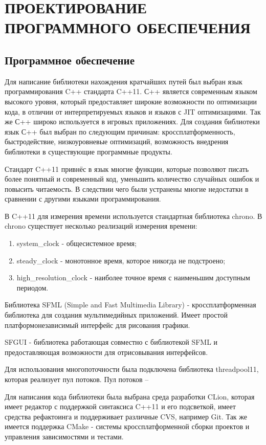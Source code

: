 \section{\MakeTextUppercase{ПРОЕКТИРОВАНИЕ ПРОГРАММНОГО ОБЕСПЕЧЕНИЯ}}
\subsection{Программное обеспечение}

Для написание библиотеки нахождения кратчайших путей был выбран язык программирования C++ стандарта C++11. С++ является современным языком высокого уровня, который предоставляет широкие возможности по оптимизации кода, в отличии от интерпретируемых языков и языков с JIT оптимизациями. Так же С++ широко используется в игровых приложениях. Для создания библиотеки язык С++ был выбран по следующим причинам: кроссплатформенность, быстродействие, низкоуровневые оптимизаций, возможность внедрения библиотеки в существующие программные продукты. 

Стандарт C++11 привнёс в язык многие функции, которые позволяют писать более понятный и современный код, уменьшить количество случайных ошибок и повысить читаемость. В следствии чего были устранены многие недостатки в сравнении с другими языками программирования.

В C++11 для измерения времени используется стандартная библиотека chrono. В chrono существует несколько реализаций измерения времени:

\begin{enumerate}
    \item system\_clock - общесистемное время;
    \item steady\_clock - монотонное время, которое никогда не подстроено;
    \item high\_resolution\_clock - наиболее точное время с наименьшим доступным периодом.  
\end{enumerate} 

Библиотека SFML (Simple and Fast Multimedia Library) - кроссплатформенная библиотека для создания мультимедийных приложений. Имеет простой платформонезависимый интерфейс для рисования графики.

SFGUI - библиотека работающая совместно с библиотекой SFML и предоставляющая возможности для отрисовывания интерфейсов.

Для использования многопоточности была подключена библиотека threadpool11, которая реализует пул потоков. Пул потоков -- 

Для написания кода библиотеки была выбрана среда разработки CLion, которая имеет редактор с поддержкой синтаксиса C++11 и его подсветкой, имеет средства рефактоинга и поддерживает различные CVS, например Git. Так же имеется поддержка CMake - системы кроссплатформенной сборки проектов и управления зависимостями и тестами.

